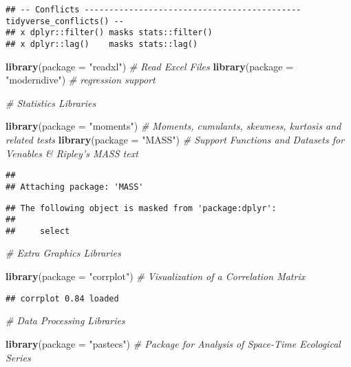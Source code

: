 \documentclass[]{article}
\newenvironment{Shaded}{\begin{snugshade}}{\end{snugshade}}
\newcommand{\CommentTok}[1]{\textcolor[rgb]{0.56,0.35,0.01}{\textit{#1}}}
\newcommand{\DataTypeTok}[1]{\textcolor[rgb]{0.13,0.29,0.53}{#1}}
\newcommand{\KeywordTok}[1]{\textcolor[rgb]{0.13,0.29,0.53}{\textbf{#1}}}
\newcommand{\NormalTok}[1]{#1}
\newcommand{\StringTok}[1]{\textcolor[rgb]{0.31,0.60,0.02}{#1}}
\begin{document}
\begin{verbatim}
## -- Conflicts -------------------------------------------- tidyverse_conflicts() --
## x dplyr::filter() masks stats::filter()
## x dplyr::lag()    masks stats::lag()
\end{verbatim}

\begin{Shaded}
\begin{Highlighting}[]
  \KeywordTok{library}\NormalTok{(}\DataTypeTok{package =} \StringTok{"readxl"}\NormalTok{)     }\CommentTok{# Read Excel Files}
  \KeywordTok{library}\NormalTok{(}\DataTypeTok{package =} \StringTok{"moderndive"}\NormalTok{) }\CommentTok{# regression support}

  \CommentTok{# Statistics Libraries}

  \KeywordTok{library}\NormalTok{(}\DataTypeTok{package =} \StringTok{"moments"}\NormalTok{)   }\CommentTok{# Moments, cumulants, skewness, kurtosis and related tests}
  \KeywordTok{library}\NormalTok{(}\DataTypeTok{package =} \StringTok{"MASS"}\NormalTok{)      }\CommentTok{# Support Functions and Datasets for Venables & Ripley's MASS text}
\end{Highlighting}
\end{Shaded}

\begin{verbatim}
## 
## Attaching package: 'MASS'
\end{verbatim}

\begin{verbatim}
## The following object is masked from 'package:dplyr':
## 
##     select
\end{verbatim}

\begin{Shaded}
\begin{Highlighting}[]
  \CommentTok{# Extra Graphics Libraries}

  \KeywordTok{library}\NormalTok{(}\DataTypeTok{package =} \StringTok{"corrplot"}\NormalTok{)  }\CommentTok{# Visualization of a Correlation Matrix}
\end{Highlighting}
\end{Shaded}

\begin{verbatim}
## corrplot 0.84 loaded
\end{verbatim}

\begin{Shaded}
\begin{Highlighting}[]
  \CommentTok{# Data Processing Libraries}

  \KeywordTok{library}\NormalTok{(}\DataTypeTok{package =} \StringTok{"pastecs"}\NormalTok{)   }\CommentTok{# Package for Analysis of Space-Time Ecological Series}
\end{Highlighting}
\end{Shaded}
\end{document}
